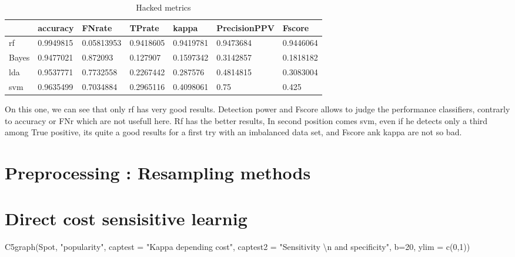 \documentclass[
]{report}
\newenvironment{Shaded}{\begin{snugshade}}{\end{snugshade}}
\newcommand{\AttributeTok}[1]{\textcolor[rgb]{0.77,0.63,0.00}{#1}}
\newcommand{\DecValTok}[1]{\textcolor[rgb]{0.00,0.00,0.81}{#1}}
\newcommand{\FunctionTok}[1]{\textcolor[rgb]{0.00,0.00,0.00}{#1}}
\newcommand{\NormalTok}[1]{#1}
\newcommand{\SpecialCharTok}[1]{\textcolor[rgb]{0.00,0.00,0.00}{#1}}
\newcommand{\StringTok}[1]{\textcolor[rgb]{0.31,0.60,0.02}{#1}}
\begin{document}
\begin{table}

\caption{\label{tab:unnamed-chunk-7}Hacked metrics}
\centering
\begin{tabular}[t]{l|l|l|l|l|l|l}
\hline
  & accuracy & FNrate & TPrate & kappa & PrecisionPPV & Fscore\\
\hline
rf & 0.9949815 & 0.05813953 & 0.9418605 & 0.9419781 & 0.9473684 & 0.9446064\\
\hline
Bayes & 0.9477021 & 0.872093 & 0.127907 & 0.1597342 & 0.3142857 & 0.1818182\\
\hline
lda & 0.9537771 & 0.7732558 & 0.2267442 & 0.287576 & 0.4814815 & 0.3083004\\
\hline
svm & 0.9635499 & 0.7034884 & 0.2965116 & 0.4098061 & 0.75 & 0.425\\
\hline
\end{tabular}
\end{table}

On this one, we can see that only rf has very good results. Detection power and Fscore allows to judge the performance classifiers, contrarly to accuracy or FNr which are not usefull here. Rf has the better results, In second position comes svm, even if he detects only a third among True positive, its quite a good results for a first try with an imbalanced data set, and Fscore ank kappa are not so bad.

\hypertarget{preprocessing-resampling-methods}{%
\section{Preprocessing : Resampling methods}\label{preprocessing-resampling-methods}}

\hypertarget{direct-cost-sensisitive-learnig}{%
\section{Direct cost sensisitive learnig}\label{direct-cost-sensisitive-learnig}}

\begin{Shaded}
\begin{Highlighting}[]
\FunctionTok{C5graph}\NormalTok{(Spot, }\StringTok{"popularity"}\NormalTok{, }\AttributeTok{captest =} \StringTok{"Kappa depending cost"}\NormalTok{, }\AttributeTok{captest2 =} \StringTok{"Sensitivity }\SpecialCharTok{\textbackslash{}n}\StringTok{ and specificity"}\NormalTok{, }\AttributeTok{b=}\DecValTok{20}\NormalTok{, }\AttributeTok{ylim =} \FunctionTok{c}\NormalTok{(}\DecValTok{0}\NormalTok{,}\DecValTok{1}\NormalTok{))}
\end{Highlighting}
\end{Shaded}
\end{document}
